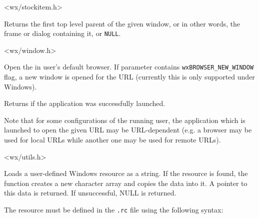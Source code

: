 


<wx/stockitem.h>


\label{wxgettoplevelparent}


Returns the first top level parent of the given window, or in other words, the
frame or dialog containing it, or {\tt NULL}.


<wx/window.h>


\label{wxlaunchdefaultbrowser}


Open the  in user's default browser. If  parameter contains
\texttt{wxBROWSER\_NEW\_WINDOW} flag, a new window is opened for the URL
(currently this is only supported under Windows).

Returns \true if the application was successfully launched.

Note that for some configurations of the running user, the application which
is launched to open the given URL may be URL-dependent (e.g. a browser may be used for
local URLs while another one may be used for remote URLs).


<wx/utils.h>


\label{wxloaduserresource}


Loads a user-defined Windows resource as a string. If the resource is found, the function creates
a new character array and copies the data into it. A pointer to this data is returned. If unsuccessful, NULL is returned.

The resource must be defined in the {\tt .rc} file using the following syntax:


